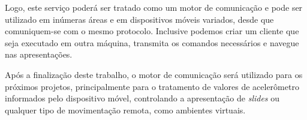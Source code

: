\documentclass{article}
\begin{document}
Logo, este serviço poderá ser tratado como um motor de comunicação e pode ser
utilizado em inúmeras áreas e em dispositivos móveis variados, desde que
comuniquem-se com o mesmo protocolo. Inclusive podemos criar um cliente que seja
executado em outra máquina, transmita os comandos necessários e navegue nas
apresentações.

Após a finalização deste trabalho, o motor de comunicação será utilizado para os
próximos projetos, principalmente para o tratamento de valores de acelerômetro
informados pelo dispositivo móvel, controlando a apresentação de \emph{slides}
ou qualquer tipo de movimentação remota, como ambientes virtuais.
\end{document}
